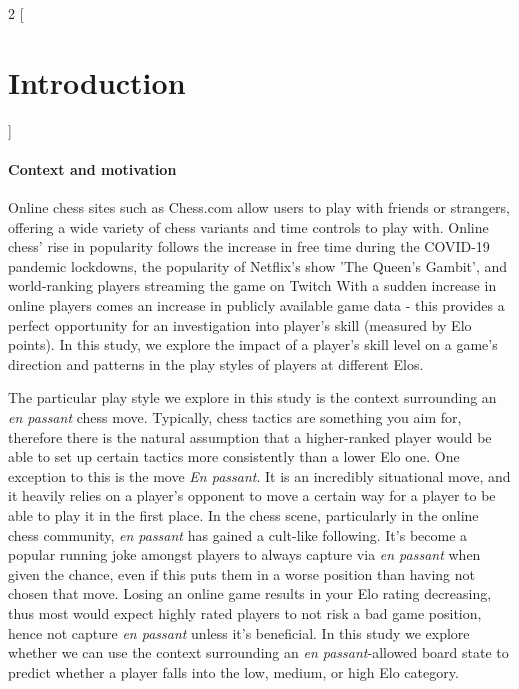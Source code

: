 \documentclass[10pt,a4paper]{article}
\begin{document}
\begin{multicols}{2}
[
\section{Introduction}
]

\paragraph{Context and motivation}

Online chess sites such as Chess.com allow users to play with friends or strangers, offering a wide variety of chess variants and time controls to play with. Online chess' rise in popularity follows the increase in free time during the COVID-19 pandemic lockdowns, the popularity of Netflix's show 'The Queen's Gambit', and world-ranking players streaming the game on Twitch \cite{The2020ChessBoom} With a sudden increase in online players comes an increase in publicly available game data - this provides a perfect opportunity for an investigation into player's skill (measured by Elo points). In this study, we explore the impact of a player's skill level on a game's direction and patterns in the play styles of players at different Elos. \newline

The particular play style we explore in this study is the context surrounding an \textit{en passant} chess move. Typically, chess tactics are something you aim for, therefore there is the natural assumption that a higher-ranked player would be able to set up certain tactics more consistently than a lower Elo one. One exception to this is the move \textit{En passant}. It is an incredibly situational move, and it heavily relies on a player's opponent to move a certain way for a player to be able to play it in the first place. In the chess scene, particularly in the online chess community, \textit{en passant} has gained a cult-like following\cite{EnPassant}. It's become a popular running joke amongst players to always capture via \textit{en passant} when given the chance, even if this puts them in a worse position than having not chosen that move. Losing an online game results in your Elo rating decreasing, thus most would expect highly rated players to not risk a bad game position, hence not capture \textit{en passant} unless it's beneficial. In this study we explore whether we can use the context surrounding an \textit{en passant}-allowed board state to predict whether a player falls into the low, medium, or high Elo category. \newline


\end{multicols}
\end{document}
